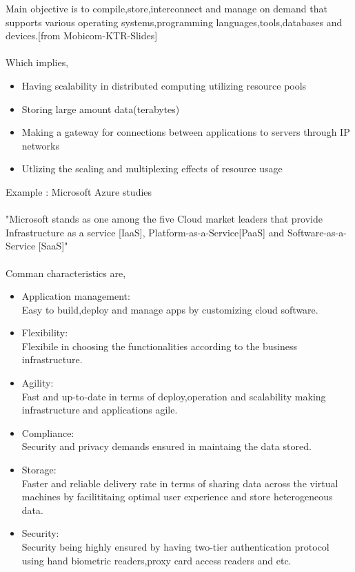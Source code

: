 Main objective is to compile,store,interconnect and manage on demand that supports various operating systems,programming languages,tools,databases and devices.[from Mobicom-KTR-Slides] \\ \\
Which implies,
\begin{itemize}
	\item Having scalability in distributed computing utilizing resource pools
	\item Storing large amount data(terabytes)
	\item Making a gateway for connections between applications to servers through IP networks
	\item Utlizing the scaling and multiplexing effects of resource usage
\end{itemize}
Example : Microsoft Azure studies\\ \\
"Microsoft stands as one among the five Cloud market leaders that provide Infrastructure as a service [IaaS], Platform-as-a-Service[PaaS] and Software-as-a-Service [SaaS]\cite{azure}"\\ \\
Comman characteristics are,\\
\begin{itemize}
	\item Application management:\\
	Easy to build,deploy and manage apps by customizing cloud software.\\
	\item Flexibility:\\
	Flexibile in choosing the functionalities according to the business infrastructure.\\
	\item Agility:\\
	Fast and up-to-date in terms of deploy,operation and scalability making infrastructure and applications agile.\\
	\item Compliance:\\
	Security and privacy demands ensured in maintaing the data stored.\\
	\item Storage:\\
	Faster and reliable delivery rate in terms of sharing data across the virtual machines by facilititaing optimal user experience and store heterogeneous data.\\
	\item Security:\\
	Security being highly ensured by having two-tier authentication protocol using hand biometric readers,proxy card access readers and etc.
	
\end{itemize}
